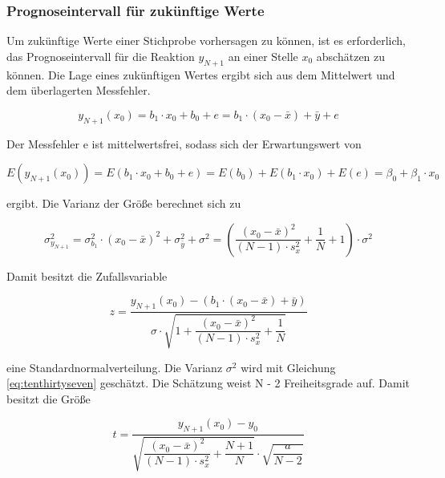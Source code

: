 \subsubsection{Prognoseintervall f\"{u}r zuk\"{u}nftige Werte}

\noindent Um zuk\"{u}nftige Werte einer Stichprobe vorhersagen zu k\"{o}nnen, ist es erforderlich, das Prognoseintervall f\"{u}r die Reaktion $y_{N+1}$ an einer Stelle $x_{0}$ absch\"{a}tzen zu k\"{o}nnen. Die Lage eines zuk\"{u}nftigen Wertes ergibt sich aus dem Mittelwert und dem \"{u}berlagerten Messfehler. 

\begin{equation}\label{eq:twelveninetyfour}
y_{N+1} (x_{0})=b_{1} \cdot x_{0} +b_{0} +e=b_{1} \cdot (x_{0} -\bar{x})+\bar{y}+e
\end{equation}

\noindent Der Messfehler e ist mittelwertsfrei, sodass sich der Erwartungswert von 

\begin{equation}\label{eq:twelveninetyfive}
E\left(y_{N+1} (x_{0})\right)=E\left(b_{1} \cdot x_{0} +b_{0} +e\right)=E(b_{0})+E\left(b_{1} \cdot x_{0} \right)+E(e)=\beta _{0} +\beta _{1} \cdot x_{0}
\end{equation}

\noindent ergibt. Die Varianz der Gr\"{o}{\ss}e berechnet sich zu

\begin{equation}\label{eq:twelveninetysix}
\sigma _{y_{N+1}}^{2} =\sigma _{b_{1}}^{2} \cdot \left(x_{0} -\bar{x}\right)^{2} +\sigma _{\bar{y}}^{2} +\sigma ^{2} =\left(\dfrac{\left(x_{0} -\bar{x}\right)^{2} }{(N-1)\cdot s_{x}^{2}} +\dfrac{1}{N} +1\right)\cdot \sigma ^{2}
\end{equation}

\noindent Damit besitzt die Zufallsvariable 

\begin{equation}\label{eq:twelveninetyseven}
z=\dfrac{y_{N+1} (x_{0})-\left(b_{1} \cdot \left(x_{0} -\bar{x}\right)+\bar{y}\right)}{\sigma \cdot \sqrt{1+\dfrac{\left(x_{0} -\bar{x}\right)^{2}}{(N-1)\cdot s_{x}^{2}} +\dfrac{1}{N}}}
\end{equation}

\noindent eine Standardnormalverteilung. Die Varianz $\sigma^{2}$ wird mit Gleichung \eqref{eq:tenthirtyseven} gesch\"{a}tzt. Die Sch\"{a}tzung weist N - 2 Freiheitsgrade auf. Damit besitzt die Gr\"{o}{\ss}e 

\begin{equation}\label{eq:twelveninetyeight}
t=\dfrac{y_{N+1} (x_{0})-y_{0}}{\sqrt{\dfrac{\left(x_{0} -\bar{x}\right)^{2} }{(N-1)\cdot s_{x}^{2}} +\dfrac{N+1}{N}} \cdot \sqrt{\dfrac{a}{N-2}}}
\end{equation}

